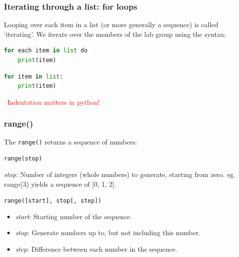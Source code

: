 \documentclass[notes]{beamer}
\begin{document}
\begin{frame}[fragile]
	\frametitle{Iterating through a list: for loops}
	
	Looping over each item in a list (or more generally a sequence) is called `iterating'. We iterate over the members of the lab group using the syntax:

	\begin{lstlisting}[language=Python]
for each item in list do
	print(item)
	\end{lstlisting}
	
	\begin{lstlisting}[language=Python]
for item in list:
	print(item)
	\end{lstlisting}
	
	\textcolor{red}{\faWarning ~Indentation matters in python!}
\end{frame}


\begin{frame}[fragile]
	\frametitle{range()}
	
	The \verb|range()| returns a sequence of numbers:
	
		\vspace{0.5cm}
		
		\verb|range(stop)|
		
		\vspace{0.5cm}
	
	\textit{stop:} Number of integers (whole numbers) to generate, starting from zero. eg. range(3) yields a sequence of [0, 1, 2].
	
	\vspace{0.5cm}
	
	\verb|range([start], stop[, step])|
	
	\begin{itemize}
		\item \textit{start}: Starting number of the sequence.
		\item \textit{stop}: Generate numbers up to, but not including this number.
		\item \textit{step}: Difference between each number in the sequence.
	\end{itemize}
	
\end{frame}

\end{document}
